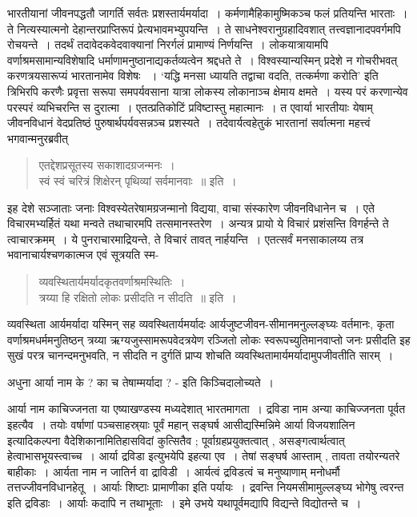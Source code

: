 {भारतीयानां जीवनपद्धतौ जागर्ति सर्वतः प्रशस्तार्यमर्यादा~। कर्मणामैहिकामुष्मिकञ्च फलं प्रतियन्ति भारताः~। ते नित्यस्यात्मनो देहान्तरप्राप्तिरूपं प्रेत्यभावमभ्युपयन्ति~। ते साधने\-श्वरानुग्रहादिवशात् तत्त्वज्ञानादपवर्गमपि रोचयन्ते~। तदर्थं तदावेदकवेदवाक्यानां निरर्गलं \-प्रामाण्यं निर्णयन्ति~। लोकयात्रायामपि वर्णाश्रमसामान्यविशेषादि धर्माणामनुष्ठानाद्य\-कर्तव्यत्वेन श्रद्दधते ते~। विश्वस्यान्यस्मिन् प्रदेशे न गोचरीभवत् करणत्रयसारूप्यं भारतानामेव विशेषः ~। ‘यद्धि मनसा ध्यायति  तद्वाचा वदति, तत्कर्मणा करोति’ इति त्रिभिरपि करणैः प्रवृत्ता सरूपा समपर्यवसाना यात्रा लोकस्य लोकानाञ्च क्षेमाय क्षमते~। यस्य परं करणान्येव परस्परं व्यभिचरन्ति स दुरात्मा~। एतत्प्रतिकोटिं प्रविष्टास्तु महात्मानः~। त एवार्या भारतीयाः येषाम् जीवनविधानं वेदप्रतिष्ठं पुरुषार्थपर्यवसन्नञ्च प्रशस्यते~। तदेवार्यत्वहेतुकं भारतानां सर्वात्मना महत्त्वं भगवान्मनुरब्रवीत् \-
\begin{verse}
एतद्देशप्रसूतस्य सकाशादग्रजन्मनः~। \\
स्वं स्वं चरित्रं शिक्षेरन् पृथिव्यां सर्वमानवाः~॥ इति~। 
\end{verse}
इह देशे सञ्जाताः जनाः विश्वस्येतरेषामग्रजन्मानो विद्यया, वाचा संस्कारेण जीवनविधानेन च~। एते विचारमभ्यर्हितं यथा मन्वते तथाचारमपि तत्समानस्तरेण~। अन्यत्र प्रायो ये विचारं प्रशंसन्ति विगर्हन्ते ते त्वाचारक्रमम्~। ये पुनराचारमाद्रियन्ते, ते विचारं तावत् नार्हयन्ति~। 
एतत्सर्वं मनसाकालय्य तत्र भवानाचार्यश्चणकात्मज एवं सूत्रयति स्म-
\begin{verse}
व्यवस्थितार्यमर्यादकृतवर्णाश्रमस्थितिः~। \\
त्रय्या हि रक्षितो लोकः प्रसीदति न सीदति~॥ इति~। 
\end{verse}
व्यवस्थिता आर्यमर्यादा यस्मिन् सह व्यवस्थितार्यमर्यादः आर्यजुष्टजीवन-सीमान\-मनुल्लङ्घ्यः वर्तमानः, कृता वर्णाश्रमधर्ममनुतिष्ठन् त्रय्या ऋग्यजुस्सामरूपवेदत्रयेण रञ्जितो लोकः स्वरूपच्युतिमानवाप्तो जनः प्रसीदति इह सुखं परत्र चानन्दमनुभवति, न सीदति न दुर्गतिं प्राप्य शोचति व्यवस्थितामार्यमर्यादामुपजीवतीति सारम्~। 

अधुना आर्या नाम के ? का च तेषाम्मर्यादा ? - इति किञ्चिदालोच्यते~। 

आर्या नाम काचिज्जनता या एष्याखण्डस्य मध्यदेशात् भारतमागता~। द्रविडा नाम अन्या काचिज्जनता पूर्वत इहत्यैव~। तयोः वर्षाणां पञ्चसाहस्र्याः पूर्वं महान् सङ्घर्ष आसीद्यस्मिन्निमे आर्या विजयशालिन इत्यादिकल्पना वैदेशिकानामितिहासविदां कुत्सितैव ; पूर्वाग्रहप्रयुक्तत्वात् , असङ्गत्वार्थत्वात् हेत्वाभासभूयस्त्वाच्च~। आर्या द्रविडा इत्युभयेपि इहत्या एव~। तेषां सङ्घर्ष आस्ताम् , तावता तयोरन्यतरे बाहीकाः~। आर्यता नाम न जातिर्न वा द्राविडी~। आर्यत्वं द्रविडत्वं च मनुष्याणाम् मनोधर्मौ तत्तज्जीवनविधानहेतू~। आर्याः शिष्टाः प्रामाणीका इति पर्यायः~। द्रवन्ति नियमसीमामुल्लङ्घ्य भोगेषु त्वरन्त इति द्रविडाः~। आर्याः कदापि न तथाभूताः~। इमे उभये यथापूर्वमद्यापि विद्यन्ते विद्योतन्ते च~। 

}
